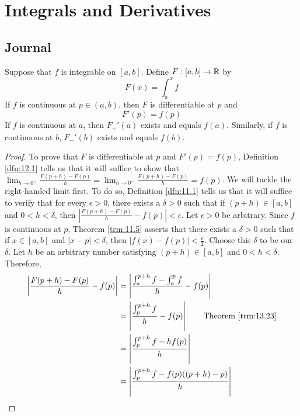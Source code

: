 \documentclass[../main.tex]{subfiles}
\begin{document}
\chapter{Integrals and Derivatives}\label{sct:14}
\section{Journal}
\begin{theorem}\label{trm:14.1}
    Suppose that $f$ is integrable on $[a,b]$. Define $F:[a,b]\to\mathbb{R}$ by
    \begin{equation*}
        F(x) = \int_a^xf
    \end{equation*}
    If $f$ is continuous at $p\in(a,b)$, then $F$ is differentiable at $p$ and
    \begin{equation*}
        F'(p) = f(p)
    \end{equation*}
    If $f$ is continuous at $a$, then $F_+'(a)$ exists and equals $f(a)$. Similarly, if $f$ is continuous at $b$, $F_-'(b)$ exists and equals $f(b)$.
    \begin{proof}
        To prove that $F$ is differentiable at $p$ and $F'(p)=f(p)$, Definition \ref{dfn:12.1} tells us that it will suffice to show that $\lim_{h\to 0^+}\frac{F(p+h)-F(p)}{h}=\lim_{h\to 0^-}\frac{F(p+h)-F(p)}{h}=f(p)$. We will tackle the right-handed limit first. To do so, Definition \ref{dfn:11.1} tells us that it will suffice to verify that for every $\epsilon>0$, there exists a $\delta>0$ such that if $(p+h)\in[a,b]$ and $0<h<\delta$, then $|\frac{F(p+h)-F(p)}{h}-f(p)|<\epsilon$. Let $\epsilon>0$ be arbitrary. Since $f$ is continuous at $p$, Theorem \ref{trm:11.5} asserts that there exists a $\delta>0$ such that if $x\in[a,b]$ and $|x-p|<\delta$, then $|f(x)-f(p)|<\frac{\epsilon}{2}$. Choose this $\delta$ to be our $\delta$. Let $h$ be an arbitrary number satisfying $(p+h)\in[a,b]$ and $0<h<\delta$. Therefore,
        \begingroup
        \allowdisplaybreaks
        \begin{align*}
            \left| \frac{F(p+h)-F(p)}{h}-f(p) \right| &= \left| \frac{\int_a^{p+h}f-\int_a^pf}{h}-f(p) \right|\\
            &= \left| \frac{\int_p^{p+h}f}{h}-f(p) \right|\tag*{Theorem \ref{trm:13.23}}\\
            &= \left| \frac{\int_p^{p+h}f-hf(p)}{h} \right|\\
            &= \left| \frac{\int_p^{p+h}f-f(p)((p+h)-p)}{h} \right|\\

\end{align*}
\end{proof}
\end{theorem}
\end{document}
